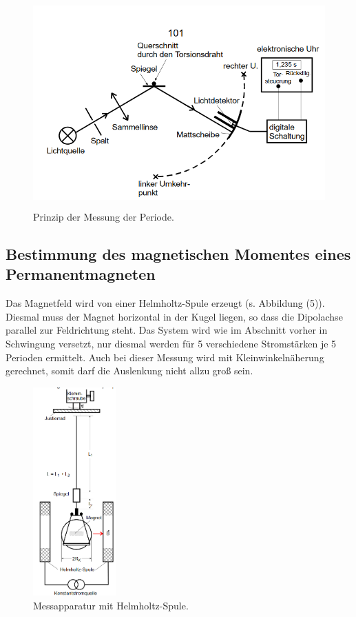\begin{figure}[H]
 \centering
  \includegraphics[height=8cm]{Screenshot (11).png}
  \caption{Prinzip der Messung der Periode.\cite{kent}}
  \label{fig:drill}
\end{figure}



\subsection{Bestimmung des magnetischen Momentes eines Permanentmagneten}
Das Magnetfeld wird von einer Helmholtz-Spule erzeugt (s. Abbildung (5)).
Diesmal muss der Magnet horizontal in der Kugel liegen, so dass die Dipolachse parallel zur Feldrichtung steht. Das System wird wie im Abschnitt vorher in Schwingung versetzt, nur diesmal werden für 5 verschiedene Stromstärken je 5 Perioden ermittelt.
Auch bei dieser Messung wird mit Kleinwinkelnäherung gerechnet, somit darf die Auslenkung nicht allzu groß sein.

\begin{figure}[H]
 \centering
  \includegraphics[height=8cm]{Screenshot (12).png}
  \caption{Messapparatur mit Helmholtz-Spule.\cite{kent}}
  \label{fig:drill}
\end{figure}